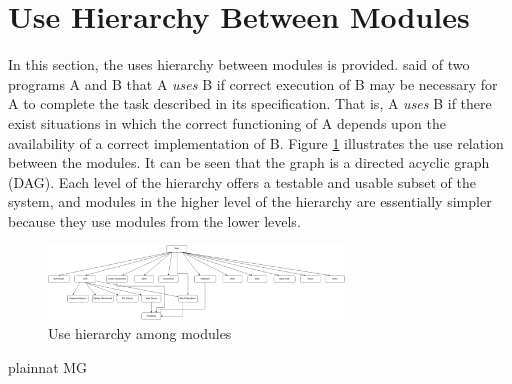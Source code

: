 \documentclass[12pt, titlepage]{article}
\begin{document}
	\section{Use Hierarchy Between Modules} \label{SecUse}
	
	In this section, the uses hierarchy between modules is
	provided. \citet{Parnas1978} said of two programs A and B that A {\em uses} B if
	correct execution of B may be necessary for A to complete the task described in
	its specification. That is, A {\em uses} B if there exist situations in which
	the correct functioning of A depends upon the availability of a correct
	implementation of B.  Figure \ref{FigUH} illustrates the use relation between
	the modules. It can be seen that the graph is a directed acyclic graph
	(DAG). Each level of the hierarchy offers a testable and usable subset of the
	system, and modules in the higher level of the hierarchy are essentially simpler
	because they use modules from the lower levels.
	
	\begin{figure}[H]
		\centering
		\includegraphics[width=0.7\textwidth]{useHierarchy.png}
		\caption{Use hierarchy among modules}
		\label{FigUH}
	\end{figure}
	
	
	 {plainnat}
	 {MG}
	
\end{document}
